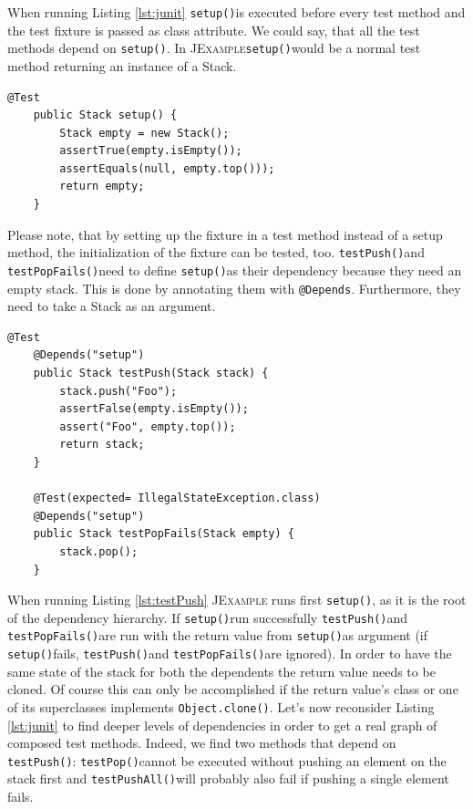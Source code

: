 \documentclass[11pt]{article}
\newcommand{\JExample}{\textsc{JExample}\xspace}
\newcommand{\ttt}[1]{\texttt{#1}}
\newcommand{\setup}{\ttt{setup()}}
\newcommand{\testPush}{\ttt{testPush()}}
\newcommand{\testPushAll}{\ttt{testPushAll()}}
\newcommand{\testPop}{\ttt{testPop()}}
\newcommand{\testPopFails}{\ttt{testPopFails()}}
\begin{document}
When running Listing \ref{lst:junit} \setup is executed before every test method and the test fixture is passed as class attribute. We could say, that all the test methods depend on \setup. In \JExample \setup would be a normal test method returning an instance of a Stack.

\begin{lstlisting}[label=lst:setup,caption=Promote fixture to test with return value.]
    @Test
    public Stack setup() {
        Stack empty = new Stack();
        assertTrue(empty.isEmpty());
        assertEquals(null, empty.top()));
        return empty;
    }
\end{lstlisting}

Please note, that by setting up the fixture in a test method instead of a setup method, the initialization of the fixture can be tested, too.
\testPush and \testPopFails need to define \setup as their dependency because they need an empty stack. This is done by annotating them with \ttt{@Depends}. Furthermore, they need to take a Stack as an argument.

\begin{lstlisting}[label=lst:testpush,caption=Take another test's result as input value.]
    @Test
    @Depends("setup")
    public Stack testPush(Stack stack) {
        stack.push("Foo");
        assertFalse(empty.isEmpty());
        assert("Foo", empty.top());
        return stack;
    }

    @Test(expected= IllegalStateException.class)
    @Depends("setup")
    public Stack testPopFails(Stack empty) {
        stack.pop();
    }
\end{lstlisting}

When running Listing \ref{lst:testPush} \JExample runs first \setup, as it is the root of the dependency hierarchy. If \setup run successfully \testPush and \testPopFails are run with the return value from \setup as argument (if \setup fails, \testPush and \testPopFails are ignored).
In order to have the same state of the stack for both the dependents the return value needs to be cloned. Of course this can only be accomplished if the return value's class or one of its superclasses implements \verb|Object.clone()|.
Let's now reconsider Listing \ref{lst:junit} to find deeper levels of dependencies in order to get a real graph of composed test methods.
Indeed, we find two methods that depend on \testPush: \testPop cannot be executed without pushing an element on the stack first and \testPushAll will probably also fail if pushing a single element fails.
\end{document}

